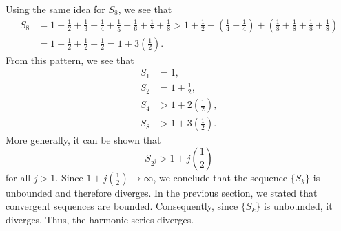 \documentclass{report}
\begin{document}
    Using the same idea for \( S_8 \), we see that
    \begin{align*}
        S_8 &= 1 + \frac{1}{2} + \frac{1}{3} + \frac{1}{4} + \frac{1}{5} + \frac{1}{6} + \frac{1}{7} + \frac{1}{8} > 1 + \frac{1}{2} + \left( \frac{1}{4} + \frac{1}{4} \right) + \left( \frac{1}{8} + \frac{1}{8} + \frac{1}{8} + \frac{1}{8} \right) \\
       &= 1 + \frac{1}{2} + \frac{1}{2} + \frac{1}{2} = 1 + 3 \left( \frac{1}{2} \right)
    .\end{align*}
    \bigbreak \noindent 
    From this pattern, we see that 
    \begin{align*}
    S_1 & = 1, \\
    S_2 & = 1 + \frac{1}{2}, \\
    S_4 & > 1 + 2 \left( \frac{1}{2} \right), \\
    S_8 & > 1 + 3 \left( \frac{1}{2} \right).
    \end{align*}
    More generally, it can be shown that 
    \[ S_{2^{j}} > 1 + j \left( \frac{1}{2} \right) \]
    for all \( j > 1 \). 
    Since \( 1 + j \left( \frac{1}{2} \right) \to \infty \), we conclude that the sequence \( \{ S_k \} \) is unbounded and therefore diverges. In the previous section, we stated that convergent sequences are bounded. Consequently, since \( \{ S_k \} \) is unbounded, it diverges. Thus, the harmonic series diverges.

    \pagebreak 
\end{document}
